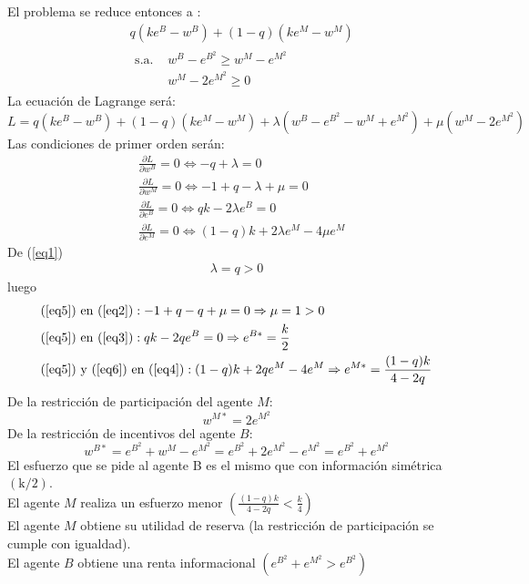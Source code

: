 \begin{enumerate}[a)]
			El problema se reduce entonces a :
					\begin{align*}
						& q\left(ke^{B}-w^{B}\right)+(1-q)\left(ke^{M}-w^{M}\right)\\
						& \begin{array}{ll}
							\text{s.a. } & w^{B}-e^{B^{2}} \geq w^{M}-e^{M^{2}} \\
										 & w^{M}-2 e^{M^{2}} \geq 0
						\end{array}
					\end{align*}
			La ecuación de Lagrange será:
				$$ L=q\left(k e^{B}-w^{B}\right)+(1-q)\left(k e^{M}-w^{M}\right)+\lambda\left(w^{B}-e^{B^{2}}-w^{M}+e^{M^{2}}\right)+\mu\left(w^{M}-2e^{M^{2}}\right) $$
			Las condiciones de primer orden serán:
				\begin{align} 
					&\frac{\partial L}{\partial w^{B}}=0 \Leftrightarrow -q+\lambda=0 \label{eq1}\\
					&\frac{\partial L}{\partial w^{M}}=0 \Leftrightarrow -1+q-\lambda+\mu=0 \label{eq2}\\
					&\frac{\partial L}{\partial e^{B}}=0 \Leftrightarrow qk-2 \lambda e^{B}=0 \label{eq3}\\
					&\frac{\partial L}{\partial e^{M}}=0 \Leftrightarrow (1-q) k+2 \lambda e^{M}-4 \mu e^{M} \label{eq4}
				\end{align}
			De (\ref{eq1})
				\begin{gather}
					\lambda=q>0 \label{eq5}
				\end{gather}
			luego
				\begin{align}
					&\text{(\ref{eq5}) en (\ref{eq2})}: -1+q-q+\mu=0 \Rightarrow \mu=1>0 \notag\\
					&\text{(\ref{eq5}) en (\ref{eq3})}: qk-2qe^{B}=0 \Rightarrow e^{B*}=\frac{k}{2} \label{eq6}\\
					&\text{(\ref{eq5}) y (\ref{eq6}) en (\ref{eq4})}: (1-q)k+2qe^{M}-4e^{M} \Rightarrow e^{M*}=\frac{(1-q)k}{4-2q} \notag
				\end{align}
			De la restricción de participación del agente $M$:
				$$w^{M*}=2e^{M^{2}}$$
			De la restricción de incentivos del agente $B$:
				$$w^{B*}=e^{B^{2}}+w^{M}-e^{M^{2}}=e^{B^{2}}+2 e^{M^{2}}-e^{M^{2}}=e^{B^{2}}+e^{M^{2}}$$
			El esfuerzo que se pide al agente B es el mismo que con información simétrica $(\mathrm{k} / 2)$.\\
			
			El agente $M$ realiza un esfuerzo menor $\left(\frac{(1-q)k}{4-2q}<\frac{k}{4}\right)$\\
			
			El agente $M$ obtiene su utilidad de reserva (la restricción de participación se cumple con igualdad).\\
			
			El agente $B$ obtiene una renta informacional $\left(e^{B^{2}}+e^{M^{2}}>e^{B^{2}}\right)$
\end{enumerate}